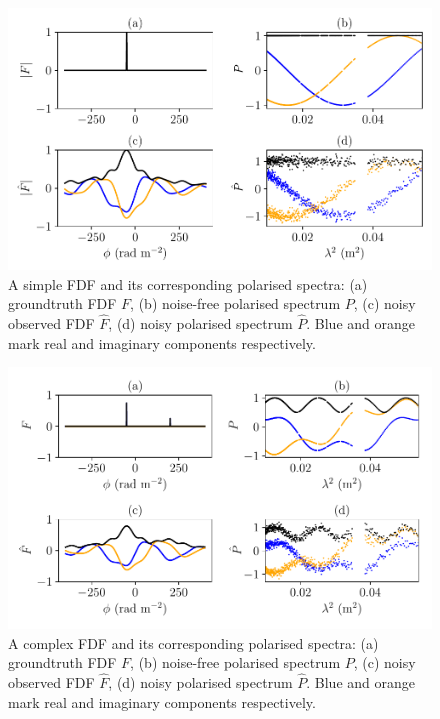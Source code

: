 \documentclass[11pt, a4paper]{book}
\begin{document}
    \begin{figure}
      \centering
      \includegraphics[width=0.9\linewidth]{faraday-images/spectra_simple.pdf}
      \caption[A simple FDF and its corresponding polarised spectra.]{A simple FDF and its corresponding polarised spectra: (a) groundtruth FDF $F$, (b) noise-free polarised spectrum $P$, (c) noisy observed FDF $\hat F$, (d) noisy polarised spectrum $\hat P$. Blue and orange mark real and imaginary components respectively.}
      \label{fig:faraday-simple-fdf}
    \end{figure}

    \begin{figure}
      \centering
      \includegraphics[width=0.94\linewidth]{faraday-images/spectra.pdf}
      \caption[A complex FDF and its corresponding polarised spectra.]{A complex FDF and its corresponding polarised spectra: (a) groundtruth FDF $F$, (b) noise-free polarised spectrum $P$, (c) noisy observed FDF $\hat F$, (d) noisy polarised spectrum $\hat P$. Blue and orange mark real and imaginary components respectively.}
      \label{fig:faraday-complex-fdf}
    \end{figure}
\end{document}
